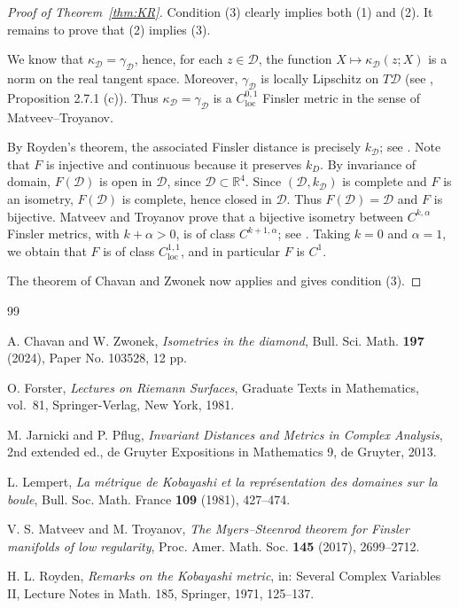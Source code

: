 \documentclass[12pt]{amsart}
\newcommand{\D}{\mathcal D}
\newcommand{\kD}{k_{\D}}
\newcommand{\kapD}{\kappa_{\D}}
\begin{document}
\begin{proof}[Proof of Theorem~\ref{thm:KR}]
Condition {\rm (3)} clearly implies both {\rm (1)}
and {\rm (2)}. It remains to prove that {\rm (2)} implies {\rm (3)}.

We know that $\kapD=\gamma_{\D}$, hence, for each
$z\in\D$, the function $X\mapsto\kapD(z;X)$ is a norm on the real
tangent space.
Moreover, $\gamma_{\D}$ is locally Lipschitz on $T\D$ (see \cite{JP}, Proposition 2.7.1 (c)). Thus $\kapD=\gamma_{\D}$ is a $C^{0,1}_{\mathrm{loc}}$ Finsler metric in the sense of Matveev--Troyanov.

By Royden's theorem, the associated Finsler distance is precisely
$\kD$; see \cite{Royden,JP}.  Note that $F$ is injective and continuous because it preserves $k_D$. By invariance of domain, $F(\D)$ is open in $\D$, since $\D\subset\mathbb R^4$.
Since $(\D,\kD)$ is complete and $F$ is an isometry, $F(\D)$ is complete, hence closed in $\D$. Thus $F(\D)=\D$ and 
$F$ is bijective. Matveev and Troyanov prove that a
bijective isometry between $C^{k,\alpha}$ Finsler metrics, with $k+\alpha>0$,
is of class $C^{k+1,\alpha}$; see \cite[Corollary~C]{MT}. Taking
$k=0$ and $\alpha=1$, we obtain that $F$ is of class
$C^{1,1}_{\mathrm{loc}}$, and in particular $F$ is $C^1$.

The theorem of Chavan and Zwonek \cite[Theorem~1]{CZ} now applies and
gives condition {\rm (3)}.
\end{proof}

\begin{thebibliography}{99}

A. Chavan and W. Zwonek,
\emph{Isometries in the diamond},
Bull. Sci. Math. \textbf{197} (2024), Paper No. 103528, 12 pp.

O. Forster,
\textit{Lectures on Riemann Surfaces},
Graduate Texts in Mathematics, vol.~81,
Springer-Verlag, New York, 1981.

M. Jarnicki and P. Pflug,
\emph{Invariant Distances and Metrics in Complex Analysis},
2nd extended ed., de Gruyter Expositions in Mathematics 9,
de Gruyter, 2013.

L. Lempert,
\emph{La m\'etrique de Kobayashi et la repr\'esentation des domaines
sur la boule},
Bull. Soc. Math. France \textbf{109} (1981), 427--474.

V. S. Matveev and M. Troyanov,
\emph{The Myers--Steenrod theorem for Finsler manifolds of low
regularity},
Proc. Amer. Math. Soc. \textbf{145} (2017), 2699--2712.

H. L. Royden,
\emph{Remarks on the Kobayashi metric},
in: Several Complex Variables II, Lecture Notes in Math. 185,
Springer, 1971, 125--137.


\end{thebibliography}
\end{document}
